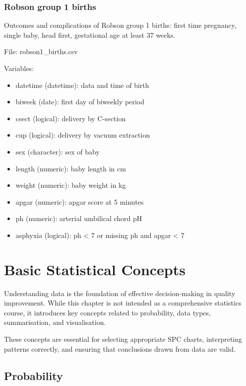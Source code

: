 \documentclass[
]{book}
\providecommand{\tightlist}{%
  \setlength{\itemsep}{0pt}\setlength{\parskip}{0pt}}
\begin{document}
\subsection*{Robson group 1 births}\label{robson-group-1-births}

Outcomes and complications of Robson group 1 births: first time
pregnancy, single baby, head first, gestational age at least 37 weeks.

File: robson1\_births.csv

Variables:

\begin{itemize}
\tightlist
\item
  datetime (datetime): data and time of birth
\item
  biweek (date): first day of biweekly period
\item
  csect (logical): delivery by C-section
\item
  cup (logical): delivery by vacuum extraction
\item
  sex (character): sex of baby
\item
  length (numeric): baby length in cm
\item
  weight (numeric): baby weight in kg
\item
  apgar (numeric): apgar score at 5 minutes
\item
  ph (numeric): arterial umbilical chord pH
\item
  asphyxia (logical): ph \textless{} 7 or missing ph and apgar
  \textless{} 7
\end{itemize}

\chapter{Basic Statistical Concepts}\label{stat-concepts}

Understanding data is the foundation of effective decision-making in
quality improvement. While this chapter is not intended as a
comprehensive statistics course, it introduces key concepts related to
probability, data types, summarisation, and visualisation.

These concepts are essential for selecting appropriate SPC charts,
interpreting patterns correctly, and ensuring that conclusions drawn
from data are valid.

\section{Probability}\label{probability}
\end{document}
